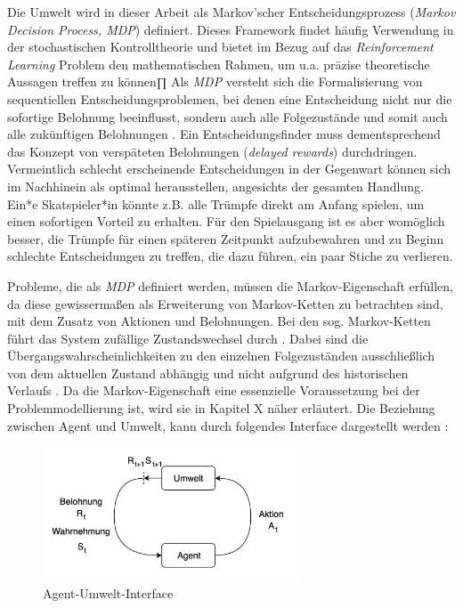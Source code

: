 Die Umwelt wird in dieser Arbeit als Markov'scher Entscheidungsprozess (\textit{Markov Decision Process, MDP}) definiert. Dieses Framework findet häufig Verwendung in der stochastischen Kontrolltheorie \cite[S.~3]{Gosavi} und bietet im Bezug auf das \textit{Reinforcement Learning} Problem den mathematischen Rahmen, um u.a. präzise theoretische Aussagen treffen zu können∏ Als \textit{MDP} versteht sich die Formalisierung von sequentiellen Entscheidungsproblemen, bei denen eine Entscheidung nicht nur die sofortige Belohnung beeinflusst, sondern auch alle Folgezustände und somit auch alle zukünftigen Belohnungen \cite[S.~47]{Sutton1998}. Ein Entscheidungsfinder muss dementsprechend das Konzept von verspäteten Belohnungen (\textit{delayed rewards}) durchdringen. Vermeintlich schlecht erscheinende Entscheidungen in der Gegenwart können sich im Nachhinein als optimal herausstellen, angesichts der gesamten Handlung. Ein*e Skatspieler*in könnte z.B. alle Trümpfe direkt am Anfang spielen, um einen sofortigen Vorteil zu erhalten. Für den Spielausgang ist es aber womöglich besser, die Trümpfe für einen späteren Zeitpunkt aufzubewahren und zu Beginn \glqq schlechte \grqq{} Entscheidungen zu treffen, die dazu führen, ein paar Stiche zu verlieren.
\par 
Probleme, die als \textit{MDP} definiert werden, müssen die Markov-Eigenschaft erfüllen, da diese gewissermaßen als Erweiterung von Markov-Ketten zu betrachten sind, mit dem Zusatz von Aktionen und Belohnungen. Bei den sog. Markov-Ketten führt das System zufällige Zustandswechsel durch \cite[S.~3]{Gosavi}. Dabei sind die Übergangswahrscheinlichkeiten zu den einzelnen Folgezuständen ausschließlich von dem aktuellen Zustand abhängig und nicht aufgrund des historischen Verlaufs \cite[S.~3]{Gosavi}. Da die Markov-Eigenschaft eine essenzielle Voraussetzung bei der Problemmodellierung ist, wird sie in Kapitel X näher erläutert. Die Beziehung zwischen Agent und Umwelt, kann durch folgendes Interface dargestellt werden \cite[S.~48]{Sutton1998}:

\par 

\begin{figure}[H]
    \centering
    \includegraphics[height=150px]{images/agentUmweltInterface.png}
    \caption{Agent-Umwelt-Interface}
\end{figure}


